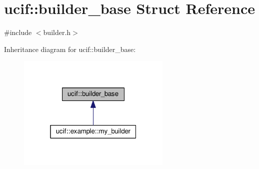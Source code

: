\hypertarget{structucif_1_1builder__base}{\section{ucif\-:\-:builder\-\_\-base Struct Reference}
\label{structucif_1_1builder__base}
}


{\ttfamily \#include $<$builder.\-h$>$}



Inheritance diagram for ucif\-:\-:builder\-\_\-base\-:
\nopagebreak
\begin{figure}[H]
\begin{center}
\leavevmode
\includegraphics[width=208pt]{structucif_1_1builder__base__inherit__graph}
\end{center}
\end{figure}
